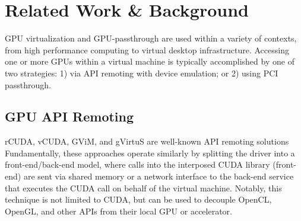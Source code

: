 \section{Related Work \& Background}\label{RELATED}

GPU virtualization and GPU-passthrough are used within a variety of contexts,
from high performance computing to virtual desktop infrastructure.  Accessing one or
more GPUs within a virtual machine is typically accomplished by one of two
strategies: 1) via API remoting with device emulation; or 2) using PCI
passthrough.  


\subsection {GPU API Remoting}

rCUDA, vCUDA, GViM, and gVirtuS are well-known API
remoting solutions%
Fundamentally, these approaches operate similarly by splitting the driver into a
front-end/back-end model, where calls into the interposed CUDA library
(front-end)  are sent via shared memory or a network interface to the back-end
service that executes the CUDA call on behalf of the virtual machine.  Notably,
this technique is not limited to CUDA, but can be used to decouple OpenCL,
OpenGL, and other APIs from their local GPU or accelerator. 



